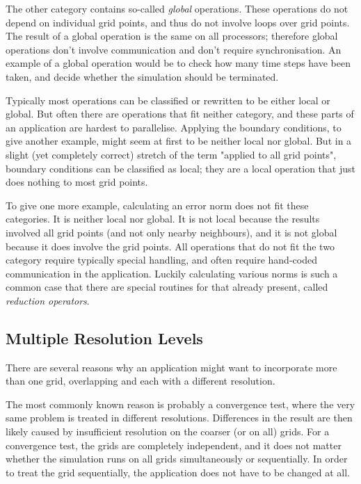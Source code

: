 The other category contains so-called \emph{global} operations.  These
operations do not depend on individual grid points, and thus do not
involve loops over grid points.  The result of a global operation is
the same on all processors; therefore global operations don't involve
communication and don't require synchronisation.  An example of a
global operation would be to check how many time steps have been
taken, and decide whether the simulation should be terminated.

Typically most operations can be classified or rewritten to be either
local or global.  But often there are operations that fit neither
category, and these parts of an application are hardest to
parallelise.  Applying the boundary conditions, to give another
example, might seem at first to be neither local nor global.  But in a
slight (yet completely correct) stretch of the term "applied to all
grid points", boundary conditions can be classified as local; they are
a local operation that just does nothing to most grid points.

To give one more example, calculating an error norm does not fit these
categories.  It is neither local nor global.  It is not local because
the results involved all grid points (and not only nearby neighbours),
and it is not global because it does involve the grid points.  All
operations that do not fit the two category require typically special
handling, and often require hand-coded communication in the
application.  Luckily calculating various norms is such a common case
that there are special routines for that already present, called
\emph{reduction operators}.

\subsection{Multiple Resolution Levels}

There are several reasons why an application might want to incorporate
more than one grid, overlapping and each with a different resolution.

The most commonly known reason is probably a convergence test, where
the very same problem is treated in different resolutions.
Differences in the result are then likely caused by insufficient
resolution on the coarser (or on all) grids.  For a convergence test,
the grids are completely independent, and it does not matter whether
the simulation runs on all grids simultaneously or sequentially.  In
order to treat the grid sequentially, the application does not have to
be changed at all.

